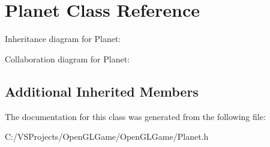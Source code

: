\hypertarget{class_planet}{\section{Planet Class Reference}
\label{class_planet}
}


Inheritance diagram for Planet\-:


Collaboration diagram for Planet\-:
\subsection*{Additional Inherited Members}


The documentation for this class was generated from the following file\-:\begin{DoxyCompactItemize}
\item 
C\-:/\-V\-S\-Projects/\-Open\-G\-L\-Game/\-Open\-G\-L\-Game/Planet.\-h\end{DoxyCompactItemize}
